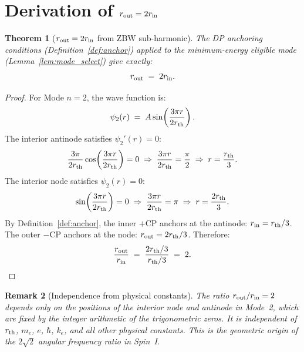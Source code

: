 \documentclass[12pt]{article}
\newtheorem{theorem}{Theorem}[section]
\newtheorem{remark}[theorem]{Remark}
\newcommand{\rth}{r_{\rm th}}
\newcommand{\rin}{r_{\rm in}}
\newcommand{\rout}{r_{\rm out}}
\begin{document}
\section{Derivation of $\rout = 2\rin$}
\label{sec:derivation}

\begin{theorem}[$\rout = 2\rin$ from ZBW sub-harmonic]
\label{thm:ratio}
The DP anchoring conditions (Definition~\ref{def:anchor}) applied to
the minimum-energy eligible mode (Lemma~\ref{lem:mode_select}) give
exactly:
\begin{equation}
  \rout \;=\; 2\rin.
  \label{eq:ratio}
\end{equation}
\end{theorem}

\begin{proof}
For Mode $n=2$, the wave function is:
\begin{equation}
  \psi_2(r) \;=\; A\sin\!\left(\frac{3\pi r}{2\rth}\right).
  \label{eq:psi2}
\end{equation}
The interior antinode satisfies $\psi_2'(r) = 0$:
\begin{equation}
  \frac{3\pi}{2\rth}\cos\!\left(\frac{3\pi r}{2\rth}\right) = 0
  \;\Rightarrow\; \frac{3\pi r}{2\rth} = \frac{\pi}{2}
  \;\Rightarrow\; r = \frac{\rth}{3}.
  \label{eq:antinode_pos}
\end{equation}
The interior node satisfies $\psi_2(r) = 0$:
\begin{equation}
  \sin\!\left(\frac{3\pi r}{2\rth}\right) = 0
  \;\Rightarrow\; \frac{3\pi r}{2\rth} = \pi
  \;\Rightarrow\; r = \frac{2\rth}{3}.
  \label{eq:node_pos}
\end{equation}
By Definition~\ref{def:anchor}, the inner $+$CP anchors at the
antinode: $\rin = \rth/3$.  The outer $-$CP anchors at the node:
$\rout = 2\rth/3$.  Therefore:
\begin{equation}
  \frac{\rout}{\rin} \;=\; \frac{2\rth/3}{\rth/3} \;=\; 2.
  \label{eq:ratio_proof}
\end{equation}
\end{proof}

\begin{remark}[Independence from physical constants]
The ratio $\rout/\rin = 2$ depends only on the positions of the
interior node and antinode in Mode~2, which are fixed by the
integer arithmetic of the trigonometric zeros.  It is independent
of $\rth$, $m_e$, $e$, $\hbar$, $k_e$, and all other physical
constants.  This is the geometric origin of the $2\sqrt{2}$ angular
frequency ratio in Spin~I.
\end{remark}
\end{document}
